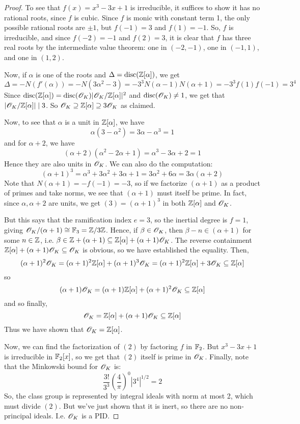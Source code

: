 \begin{proof}
	To see that $f(x) = x^3-3x+1$ is irreducible, it suffices to show it has no rational roots, since $f$ is cubic. Since $f$ is monic with constant term 1, the only possible rational roots are $\pm 1$, but $f(-1) = 3$ and $f(1) = -1$. So, $f$ is irreducible, and since $f(-2) = -1$ and $f(2) = 3$, it is clear that $f$ has three real roots by the intermediate value theorem: one in $(-2,-1)$, one in $(-1,1)$, and one in $(1,2)$.
	
	Now, if $\alpha$ is one of the roots and $\Delta = \operatorname{disc}(\mathbb{Z}[\alpha])$, we get
	\[ \Delta = -N(f'(\alpha)) = -N(3\alpha^2-3) = -3^3N(\alpha-1)N(\alpha+1) = -3^3f(1)f(-1) = 3^4 \]
	Since $\operatorname{disc}(\mathbb{Z}[\alpha]) = \operatorname{disc}(\mathscr{O}_K)|\mathscr{O}_K/\mathbb{Z}[\alpha]|^2$ and $\operatorname{disc}(\mathscr{O}_K) \neq 1$, we get that $|\mathscr{O}_K/\mathbb{Z}[\alpha]| \mid 3$. So $\mathscr{O}_K \supseteq \mathbb{Z}[\alpha] \supseteq 3\mathscr{O}_K$ as claimed.
	
	Now, to see that $\alpha$ is a unit in $\mathbb{Z}[\alpha]$, we have
	\[ \alpha(3-\alpha^2) = 3\alpha-\alpha^3 = 1 \]
	and for $\alpha+2$, we have
	\[ (\alpha+2)(\alpha^2-2\alpha+1) = \alpha^3-3\alpha+2 = 1 \]
	Hence they are also units in $\mathscr{O}_K$. We can also do the computation:
	\[ (\alpha+1)^3 = \alpha^3+3\alpha^2+3\alpha+1 = 3\alpha^2+6\alpha = 3\alpha(\alpha+2) \]
	Note that $N(\alpha+1) = -f(-1) = -3$, so if we factorize $(\alpha+1)$ as a product of primes and take norms, we see that $(\alpha+1)$ must itself be prime. In fact, since $\alpha,\alpha+2$ are units, we get $(3) = (\alpha+1)^3$ in both $\mathbb{Z}[\alpha]$ and $\mathscr{O}_K$.
	
	But this says that the ramification index $e = 3$, so the inertial degree is $f=1$, giving $\mathscr{O}_K/(\alpha+1) \cong \mathbb{F}_3 = \mathbb{Z}/3\mathbb{Z}$. Hence, if $\beta \in \mathscr{O}_K$, then $\beta - n \in (\alpha+1)$ for some $n \in \mathbb{Z}$, i.e. $\beta \in \mathbb{Z} + (\alpha+1) \subseteq \mathbb{Z}[\alpha] + (\alpha+1)\mathscr{O}_K$. The reverse containment $\mathbb{Z}[\alpha]+(\alpha+1)\mathscr{O}_K \subseteq \mathscr{O}_K$ is obvious, so we have established the equality. Then,
	\[ (\alpha+1)^2\mathscr{O}_K = (\alpha+1)^2\mathbb{Z}[\alpha]+(\alpha+1)^3\mathscr{O}_K = (\alpha+1)^2\mathbb{Z}[\alpha]+3\mathscr{O}_K \subseteq \mathbb{Z}[\alpha] \]
	so
	\[ (\alpha+1)\mathscr{O}_K = (\alpha+1)\mathbb{Z}[\alpha]+(\alpha+1)^2\mathscr{O}_K \subseteq \mathbb{Z}[\alpha] \]
	and so finally,
	\[ \mathscr{O}_K = \mathbb{Z}[\alpha] + (\alpha+1)\mathscr{O}_K \subseteq \mathbb{Z}[\alpha] \]
	Thus we have shown that $\mathscr{O}_K = \mathbb{Z}[\alpha]$.
	
	Now, we can find the factorization of $(2)$ by factoring $f$ in $\mathbb{F}_2$. But $x^3-3x+1$ is irreducible in $\mathbb{F}_2[x]$, so we get that $(2)$ itself is prime in $\mathscr{O}_K$. Finally, note that the Minkowski bound for $\mathscr{O}_K$ is:
	\[ \frac{3!}{3^3}\left(\frac{4}{\pi}\right)^0|3^4|^{1/2} = 2 \]
	So, the class group is represented by integral ideals with norm at most 2, which must divide $(2)$. But we've just shown that it is inert, so there are no non-principal ideals. I.e. $\mathscr{O}_K$ is a PID.
\end{proof}
